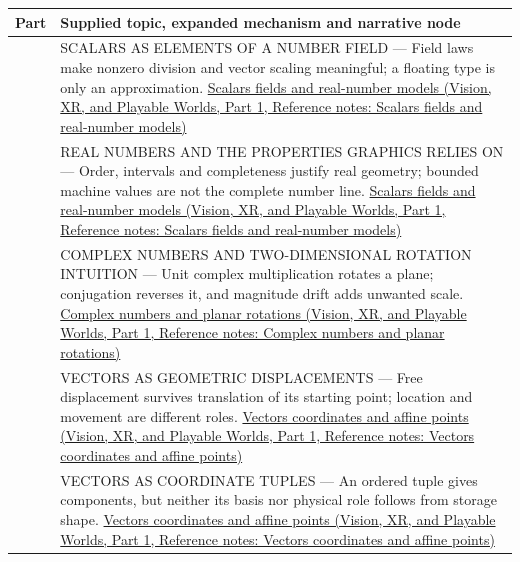 {\def\LTcaptype{none} %
\begin{longtable}[]{@{}
  >{\raggedright\arraybackslash}p{}
  >{\raggedright\arraybackslash}p{}@{}}
\toprule\noalign{}
\begin{minipage}[b]{\linewidth}\raggedright
Part
\end{minipage} & \begin{minipage}[b]{\linewidth}\raggedright
Supplied topic, expanded mechanism and narrative node
\end{minipage} \\
\midrule\noalign{}
\endhead
\bottomrule\noalign{}
\endlastfoot
501 & SCALARS AS ELEMENTS OF A NUMBER FIELD --- Field laws make nonzero division and vector scaling meaningful; a floating type is only an approximation. \href{../07-Vision-XR-and-Playable-Worlds-P01/main.pdf\#nameddest=appendix-52051ad550fe}{Scalars fields and real-number models (Vision, XR, and Playable Worlds, Part 1, Reference notes: Scalars fields and real-number models)} \\
502 & REAL NUMBERS AND THE PROPERTIES GRAPHICS RELIES ON --- Order, intervals and completeness justify real geometry; bounded machine values are not the complete number line. \href{../07-Vision-XR-and-Playable-Worlds-P01/main.pdf\#nameddest=appendix-52051ad550fe}{Scalars fields and real-number models (Vision, XR, and Playable Worlds, Part 1, Reference notes: Scalars fields and real-number models)} \\
503 & COMPLEX NUMBERS AND TWO-DIMENSIONAL ROTATION INTUITION --- Unit complex multiplication rotates a plane; conjugation reverses it, and magnitude drift adds unwanted scale. \href{../07-Vision-XR-and-Playable-Worlds-P01/main.pdf\#nameddest=appendix-f77eadcc4a93}{Complex numbers and planar rotations (Vision, XR, and Playable Worlds, Part 1, Reference notes: Complex numbers and planar rotations)} \\
504 & VECTORS AS GEOMETRIC DISPLACEMENTS --- Free displacement survives translation of its starting point; location and movement are different roles. \href{../07-Vision-XR-and-Playable-Worlds-P01/main.pdf\#nameddest=appendix-0659864c0aa3}{Vectors coordinates and affine points (Vision, XR, and Playable Worlds, Part 1, Reference notes: Vectors coordinates and affine points)} \\
505 & VECTORS AS COORDINATE TUPLES --- An ordered tuple gives components, but neither its basis nor physical role follows from storage shape. \href{../07-Vision-XR-and-Playable-Worlds-P01/main.pdf\#nameddest=appendix-0659864c0aa3}{Vectors coordinates and affine points (Vision, XR, and Playable Worlds, Part 1, Reference notes: Vectors coordinates and affine points)} \\

\end{longtable}}
